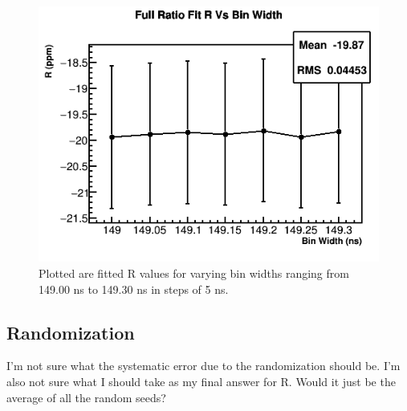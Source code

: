 		\begin{figure}[]
			\centering
			\includegraphics[width=.6\textwidth]{BinWidthComparison}
		    \caption[BinWidth]{Plotted are fitted R values for varying bin widths ranging from 149.00 ns to 149.30 ns in steps of 5 ns.}
		    \label{fig:BinWidth}
		\end{figure}

	\subsection{Randomization}

		I'm not sure what the systematic error due to the randomization should be. I'm also not sure what I should take as my final answer for R. Would it just be the average of all the random seeds?

